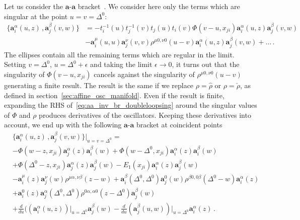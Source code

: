 Let us consider the $\mathbf{a}$-$\mathbf{a}$ bracket~. We consider here only the terms which are singular at the point $u=v=\Delta^0$:
\begin{equation}
\label{eq:aa_inv_br_doubleloopsing}
\begin{split}
\{\mathbf{a}_i^\alpha(u,z) \,,\mathbf{a}_j^\beta(v,w) \}&= -t^{-1}_i(u) t^{-1}_j(v)    t_j(u) t_i(v)    
  \Phi(v-u, x_{ji})\mathbf{a}_i^\alpha(u,z) \mathbf{a}_j^\beta(v,w)  \\
&-   \mathbf{a}_i^\mu (u,u)\mathbf{a}_j^\nu(v,v) \rho^{\mu 0, \nu 0}(u-v) \mathbf{a}_i^\alpha(u,z) \mathbf{a}_j^\beta(v,w)+\dots\,.
\end{split}
\end{equation}
The ellipses contain all the remaining terms which are regular in the limit. Setting $v=\Delta^0$, $u=\Delta^0+\epsilon$ and taking the limit $\epsilon \to 0$, it turns out that the singularity of $\Phi(v-u, x_{ji})$ cancels against the singularity of $\rho^{\mu 0, \nu 0}(u-v)$ generating a finite result. 
The result is the same if we replace $\rho=\hat{\rho}$ or $\rho=\check{\rho}$, as defined in section~\ref{sec:affine_osc_manifold}.
Even if the result is finite, expanding the RHS of~\eqref{eq:aa_inv_br_doubleloopsing} around the singular values of $\Phi$ and $\rho$ produces derivatives of the oscillators. Keeping these derivatives into account, we end up with the following $\mathbf{a}$-$\mathbf{a}$ bracket at coincident points
\begin{equation}
\label{eq:aa_bracket_final_components_main}
\begin{split}
&\{\mathbf{a}_i^\alpha(u,z) \,,\mathbf{a}_j^\beta(v,w) \}\bigl|_{u=v=\Delta^0}=\\
&  -  \Phi(w-z, x_{ji})\mathbf{a}_j^\alpha(z) \mathbf{a}_i^\beta(w) +  \Phi(w-\Delta^0, x_{ji})\mathbf{a}_i^\alpha(z) \mathbf{a}_i^\beta(w)\\
&+  \Phi(\Delta^0-z, x_{ji})\mathbf{a}_j^\alpha(z) \mathbf{a}_j^\beta(w)- E_1(x_{ji})\mathbf{a}_i^\alpha(z) \mathbf{a}_j^\beta(w)\\
&- \mathbf{a}_i^\mu(z)\mathbf{a}_j^\nu(w) \rho^{\mu \alpha, \nu \beta}(z-w) +\mathbf{a}_i^\beta (\Delta^0,\Delta^0)\mathbf{a}_j^0(w)   \rho^{\beta 0, 0 \beta}(\Delta^0-w) \mathbf{a}_i^\alpha( z)\\
&+ \mathbf{a}_i^0 (z)\mathbf{a}_j^\alpha(\Delta^0,\Delta^0)   \rho^{0 \alpha, \alpha 0}(z-\Delta^0) \mathbf{a}_j^\beta(w)\\
&+ \frac{d}{du} ((\mathbf{a}_i^\alpha(u,z) )\Bigr|_{u=\Delta^0}   \mathbf{a}_j^\beta(w)- \frac{d}{du} (\mathbf{a}_j^\beta(u,w) )\Bigr|_{u=\Delta^0}  \mathbf{a}_i^\alpha(z)\,.
\end{split}
\end{equation}
